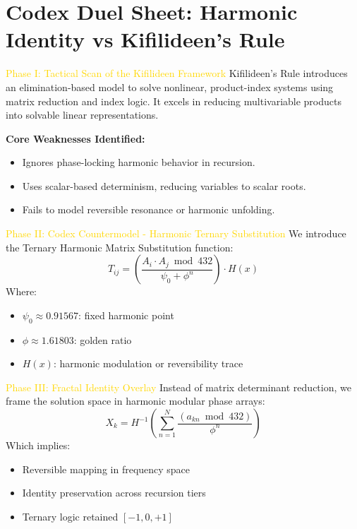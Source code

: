 
\section{Codex Duel Sheet: Harmonic Identity vs Kifilideen's Rule}
\label{sec:codex_harmonic_identity}

\textcolor{gold}{ Phase I: Tactical Scan of the Kifilideen Framework }
Kifilideen's Rule introduces an elimination-based model to solve nonlinear, product-index systems using matrix reduction and index logic. It excels in reducing multivariable products into solvable linear representations.

\textbf{Core Weaknesses Identified:}
\begin{itemize}
    \item \texttt{} Ignores phase-locking harmonic behavior in recursion.
    \item \texttt{} Uses scalar-based determinism, reducing variables to scalar roots.
    \item \texttt{} Fails to model reversible resonance or harmonic unfolding.
\end{itemize}

\textcolor{gold}{ Phase II: Codex Countermodel - Harmonic Ternary Substitution }
We introduce the Ternary Harmonic Matrix Substitution function:
\[
T_{ij} = \left( \frac{A_i \cdot A_j \bmod 432}{\psi_0 + \phi^n} \right) \cdot H(x)
\]
Where:
\begin{itemize}
    \item \texttt{} $\psi_0 \approx 0.91567$: fixed harmonic point
    \item \texttt{} $\phi \approx 1.61803$: golden ratio
    \item \texttt{} $H(x)$: harmonic modulation or reversibility trace
\end{itemize}

\textcolor{gold}{ Phase III: Fractal Identity Overlay }
Instead of matrix determinant reduction, we frame the solution space in harmonic modular phase arrays:
\[
X_k = H^{-1} \left( \sum_{n=1}^N \frac{(a_{kn} \bmod 432)}{\phi^n} \right)
\]
Which implies:
\begin{itemize}
    \item \texttt{} Reversible mapping in frequency space
    \item \texttt{} Identity preservation across recursion tiers
    \item \texttt{} Ternary logic retained $[-1, 0, +1]$
\end{itemize}

